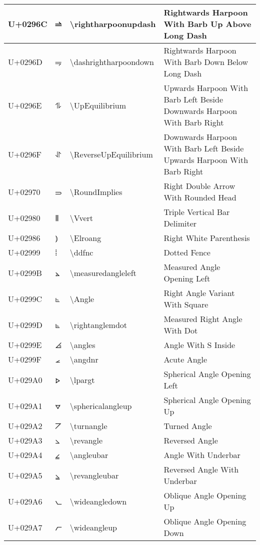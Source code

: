 \begin{table}[h]
\begin{tabulary}{\linewidth}{|L|L|L|L|}
\hline
U+0296C & ⥬ & {\textbackslash}rightharpoonupdash & Rightwards Harpoon With Barb Up Above Long Dash \\
\hline
U+0296D & ⥭ & {\textbackslash}dashrightharpoondown & Rightwards Harpoon With Barb Down Below Long Dash \\
\hline
U+0296E & ⥮ & {\textbackslash}UpEquilibrium & Upwards Harpoon With Barb Left Beside Downwards Harpoon With Barb Right \\
\hline
U+0296F & ⥯ & {\textbackslash}ReverseUpEquilibrium & Downwards Harpoon With Barb Left Beside Upwards Harpoon With Barb Right \\
\hline
U+02970 & ⥰ & {\textbackslash}RoundImplies & Right Double Arrow With Rounded Head \\
\hline
U+02980 & ⦀ & {\textbackslash}Vvert & Triple Vertical Bar Delimiter \\
\hline
U+02986 & ⦆ & {\textbackslash}Elroang & Right White Parenthesis \\
\hline
U+02999 & ⦙ & {\textbackslash}ddfnc & Dotted Fence \\
\hline
U+0299B & ⦛ & {\textbackslash}measuredangleleft & Measured Angle Opening Left \\
\hline
U+0299C & ⦜ & {\textbackslash}Angle & Right Angle Variant With Square \\
\hline
U+0299D & ⦝ & {\textbackslash}rightanglemdot & Measured Right Angle With Dot \\
\hline
U+0299E & ⦞ & {\textbackslash}angles & Angle With S Inside \\
\hline
U+0299F & ⦟ & {\textbackslash}angdnr & Acute Angle \\
\hline
U+029A0 & ⦠ & {\textbackslash}lpargt & Spherical Angle Opening Left \\
\hline
U+029A1 & ⦡ & {\textbackslash}sphericalangleup & Spherical Angle Opening Up \\
\hline
U+029A2 & ⦢ & {\textbackslash}turnangle & Turned Angle \\
\hline
U+029A3 & ⦣ & {\textbackslash}revangle & Reversed Angle \\
\hline
U+029A4 & ⦤ & {\textbackslash}angleubar & Angle With Underbar \\
\hline
U+029A5 & ⦥ & {\textbackslash}revangleubar & Reversed Angle With Underbar \\
\hline
U+029A6 & ⦦ & {\textbackslash}wideangledown & Oblique Angle Opening Up \\
\hline
U+029A7 & ⦧ & {\textbackslash}wideangleup & Oblique Angle Opening Down \\

\end{tabulary}
\end{table}

